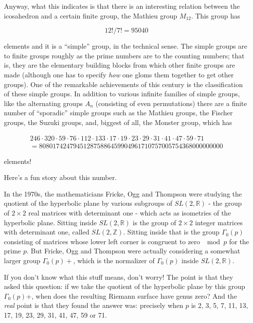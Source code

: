 \documentclass{article}
\begin{document}
Anyway, what this indicates is that there is an interesting relation
between the icosahedron and a certain finite group, the Mathieu group
\(M_{12}\). This group has

\[12!/7! = 95040\]

elements and it is a ``simple'' group, in the technical sense. The
simple groups are to finite groups roughly as the prime numbers are to
the counting numbers; that is, they are the elementary building blocks
from which other finite groups are made (although one has to specify
\emph{how} one gloms them together to get other groups). One of the
remarkable achievements of this century is the classification of these
simple groups. In addition to various infinite families of simple
groups, like the alternating groups \(A_n\) (consisting of even
permutations) there are a finite number of ``sporadic'' simple groups
such as the Mathieu groups, the Fischer groups, the Suzuki groups, and,
biggest of all, the Monster group, which has

\[\begin{gathered}246\cdot320\cdot59\cdot76\cdot112\cdot133\cdot17\cdot19\cdot23\cdot29\cdot31\cdot41\cdot47\cdot59\cdot71 \\= 808017424794512875886459904961710757005754368000000000\end{gathered}\]

elements!

Here's a fun story about this number.

In the 1970s, the mathematicians Fricke, Ogg and Thompson were studying
the quotient of the hyperbolic plane by various subgroups of
\(SL(2,\mathbb{R})\) - the group of \(2\times2\) real matrices with
determinant one - which acts as isometries of the hyperbolic plane.
Sitting inside \(SL(2,\mathbb{R})\) is the group of \(2\times2\) integer
matrices with determinant one, called \(SL(2,\mathbb{Z})\). Sitting
inside that is the group \(\Gamma_0(p)\) consisting of matrices whose
lower left corner is congruent to zero \(\mod p\) for the prime \(p\).
But Fricke, Ogg and Thompson were actually considering a somewhat larger
group \(\Gamma_0(p)+\), which is the normalizer of \(\Gamma_0(p)\)
inside \(SL(2,\mathbb{R})\).

If you don't know what this stuff means, don't worry! The point is that
they asked this question: if we take the quotient of the hyperbolic
plane by this group \(\Gamma_0(p)\)+, when does the resulting Riemann
surface have genus zero? And the \emph{real} point is that they found
the answer was: precisely when \(p\) is 2, 3, 5, 7, 11, 13, 17, 19, 23,
29, 31, 41, 47, 59 or 71.
\end{document}
